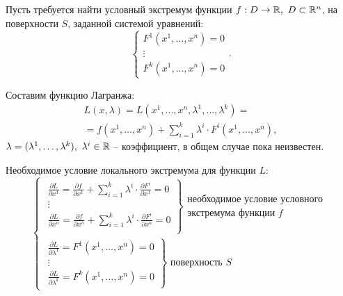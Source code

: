 \begin{task}
    Пусть требуется найти условный экстремум функции $f:D\rightarrow\mathbb{R}, \ D \subset \mathbb{R}^n$, на поверхности $S$, заданной системой уравнений:
    \[
        \left\{\begin{array}{l}
            F^1(x^1,\ldots,x^n) = 0 \\
            \vdots                  \\
            F^k(x^1,\ldots,x^n) = 0
        \end{array}\right..
    \]

    Составим функцию Лагранжа:
    \begin{multline*}
        L(x,\lambda) = L(x^1,\ldots,x^n,\lambda^1,\ldots,\lambda^k) = \\
        = f(x^1,\ldots,x^n) + \sum_{i=1}^{k}\lambda^i\cdot F^i(x^1,\ldots,x^n),
    \end{multline*}
    $\lambda = (\lambda^1,\ldots,\lambda^k), \ \lambda^i \in \mathbb{R}$ -- коэффициент, в общем случае пока неизвестен.

    Необходимое условие локального экстремума для функции $L:$
    \begin{equation}\label{eq:24}
        \left\{\begin{array}{l}
            \left.\begin{array}{l}
                      \frac{\partial L}{\partial x^1} = \frac{\partial f}{\partial x^1} + \sum_{i = 1}^{k}\lambda^i\cdot\frac{\partial F^i}{\partial x^1} = 0 \\
                      \vdots                                                                                                                                  \\
                      \frac{\partial L}{\partial x^n} = \frac{\partial f}{\partial x^n} + \sum_{i = 1}^{k}\lambda^i\cdot\frac{\partial F^i}{\partial x^n} = 0 \\
                  \end{array}\right\}\begin{array}{l}
                                         \text{необходимое условие условного} \\
                                         \text{экстремума функции }f
                                     \end{array} \\
            \left.\begin{array}{l}
                      \frac{\partial L}{\partial \lambda^1} = F^1(x^1,\ldots,x^n) = 0 \\
                      \vdots                                                          \\
                      \frac{\partial L}{\partial \lambda^k} = F^k(x^1,\ldots,x^n) = 0
                  \end{array}\right\}\text{ поверхность }S
        \end{array}\right.
    \end{equation}
\end{task}


